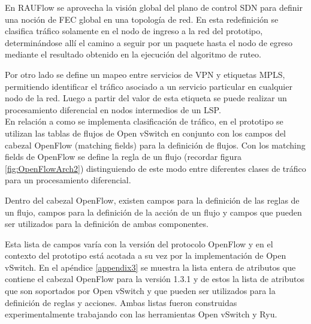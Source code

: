 En RAUFlow se aprovecha la visi\'on global del plano de control SDN para definir una noci\'on de FEC global en una topolog\'ia de red. En esta redefinici\'on se clasifica tr\'afico solamente en el nodo de ingreso a la red del prototipo, determinándose all\'i el camino a seguir por un paquete hasta el nodo de egreso mediante el resultado obtenido en la ejecuci\'on del algoritmo de ruteo. 


Por otro lado se define un mapeo entre servicios de VPN y etiquetas MPLS, permitiendo identificar el tr\'afico asociado a un servicio particular en cualquier nodo de la red. Luego a partir del valor de esta etiqueta se puede realizar un procesamiento diferencial en nodos intermedios de un LSP.\\


En relaci\'on a como se implementa clasificaci\'on de tr\'afico, en el prototipo se utilizan las tablas de flujos de Open vSwitch en conjunto con los campos del cabezal OpenFlow (matching fields) para la definici\'on de flujos. Con los matching fields de OpenFlow se define la regla de un flujo (recordar figura \ref{fig:OpenFlowArch2}) distinguiendo de este modo entre diferentes clases de tr\'afico para un procesamiento diferencial.

Dentro del cabezal OpenFlow, existen campos para la definici\'on de las reglas de un flujo, campos para la definici\'on de la acci\'on de un flujo y campos que pueden ser utilizados para la definici\'on de ambas componentes.  

Esta lista de campos var\'ia con la versi\'on del protocolo OpenFlow y en el contexto del prototipo est\'a acotada a su vez por la implementaci\'on de Open vSwitch. En el ap\'endice \ref{appendix3} se muestra  la lista entera de atributos que contiene el cabezal OpenFlow para la versi\'on 1.3.1 y de estos la lista de atributos que son soportados por Open vSwitch y que pueden ser utilizados para la definici\'on de reglas y acciones. Ambas listas fueron construidas experimentalmente trabajando con las herramientas Open vSwitch y Ryu.\\

